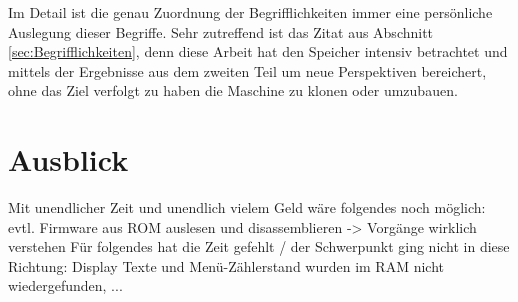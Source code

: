 Im Detail ist die genau Zuordnung der Begrifflichkeiten immer eine persönliche Auslegung dieser Begriffe.
Sehr zutreffend ist das Zitat aus Abschnitt \ref{sec:Begrifflichkeiten}, denn diese Arbeit hat den Speicher intensiv betrachtet und mittels der Ergebnisse aus dem zweiten Teil um neue Perspektiven bereichert, ohne das Ziel verfolgt zu haben die Maschine zu klonen oder umzubauen.

\section{Ausblick}
Mit unendlicher Zeit und unendlich vielem Geld wäre folgendes noch möglich: evtl.
Firmware aus ROM auslesen und disassemblieren -> Vorgänge wirklich verstehen
Für folgendes hat die Zeit gefehlt / der Schwerpunkt ging nicht in diese Richtung: Display Texte und Menü-Zählerstand wurden im RAM nicht wiedergefunden, ...
